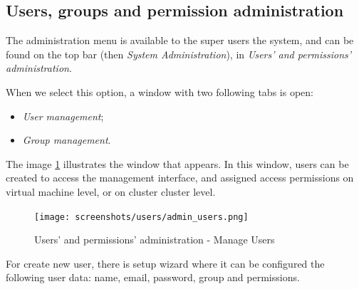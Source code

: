 \subsection{Users, groups and permission administration}
The administration menu is available to the super users the system, and can be found on the top bar (then \textit{System Administration}), in \textit{Users' and permissions' administration}.

When we select this option, a window with two following tabs is open:
\begin{itemize}
	\item \textit{User management};
	\item \textit{Group management}.
\end{itemize}

The image \ref{fig:admin_users} illustrates the window that appears. In this window, users can be created to access the management interface, and assigned access permissions on virtual machine level, or on cluster cluster level.

\begin{figure}[H]
        \begin{center}
        \texttt{[image: screenshots/users/admin\_users.png]}
        \caption{Users' and permissions' administration - Manage Users}
        \label{fig:admin_users}
        \end{center}
\end{figure}

For create new user, there is setup wizard where it can be configured the following user data: name, email, password, group and permissions.

